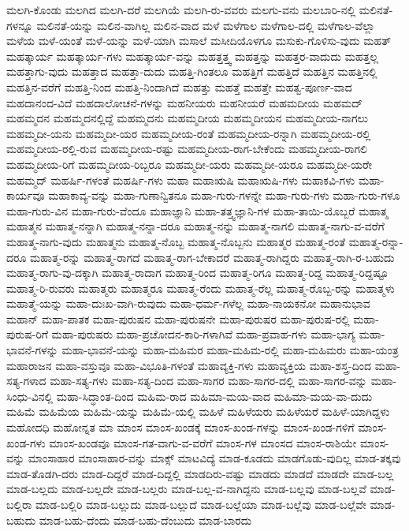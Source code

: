 {ಮಲಗಿ-ಕೊಂಡು
ಮಲಗಿದ
ಮಲಗಿ-ದರೆ
ಮಲಗಿಯೆ
ಮಲಗಿ-ರು-ವವರು
ಮಲಗು-ವನು
ಮಲಬಾರಿ-ನಲ್ಲಿ
ಮಲಿನತೆ-ಗಳನ್ನೂ
ಮಲಿನತೆ-ಯನ್ನು
ಮಲಿನ-ವಾಗಿಲ್ಲ
ಮಲಿನ-ವಾದ
ಮಳೆ
ಮಳೆಗಾಲ
ಮಳೆಗಾಲ-ದಲ್ಲಿ
ಮಳೆಗಾಲ-ವೆಲ್ಲಾ
ಮಳೆಯ
ಮಳೆ-ಯಂತೆ
ಮಳೆ-ಯನ್ನು
ಮಳೆ-ಯಾಗಿ
ಮಸಾಲೆ
ಮಸೀದಿಯೊಳಗೂ
ಮಸುಕು-ಗೊಳಿಸು-ವುದು
ಮಹತ್
ಮಹತ್ಕಾರ್ಯ
ಮಹತ್ಕಾರ್ಯ-ಗಳು
ಮಹತ್ಕಾರ್ಯ-ವನ್ನು
ಮಹತ್ತತ್ತ್ವ
ಮಹತ್ತನ್ನು
ಮಹತ್ತರ-ವಾದುದು
ಮಹತ್ತಲ್ಲ
ಮಹತ್ತಾಗು-ವುದು
ಮಹತ್ತಾದ
ಮಹತ್ತಾ-ದುದು
ಮಹತ್ತಿ-ಗಿಂತಲೂ
ಮಹತ್ತಿಗೆ
ಮಹತ್ತಿದೆ
ಮಹತ್ತಿನ
ಮಹತ್ತಿನಲ್ಲಿ
ಮಹತ್ತಿನ-ವರೆಗೆ
ಮಹತ್ತಿ-ನಿಂದ
ಮಹತ್ತಿ-ನಿಂದಾಗಿದೆ
ಮಹತ್ತು
ಮಹತ್ತೆ
ಮಹತ್ತೇ
ಮಹತ್ವ-ಪೂರ್ಣ-ವಾದ
ಮಹದಾನಂದ-ವಿದೆ
ಮಹದಾಲೋಚನೆ-ಗಳನ್ನು
ಮಹನೀಯರು
ಮಹನೀಯರೆ
ಮಹಮದೀಯ
ಮಹಮದ್
ಮಹಮ್ಮದನ
ಮಹಮ್ಮದನಲ್ಲಿದ್ದೆ
ಮಹಮ್ಮದನು
ಮಹಮ್ಮದೀಯ
ಮಹಮ್ಮದೀಯನ
ಮಹಮ್ಮದೀಯ-ನಾಗಲು
ಮಹಮ್ಮದೀ-ಯನು
ಮಹಮ್ಮದೀ-ಯರ
ಮಹಮ್ಮದೀಯ-ರಂತೆ
ಮಹಮ್ಮದೀಯ-ರನ್ನಾಗಿ
ಮಹಮ್ಮದೀಯ-ರಲ್ಲಿ
ಮಹಮ್ಮದೀಯ-ರಲ್ಲಿ-ರುವ
ಮಹಮ್ಮದೀಯ-ರಷ್ಟು
ಮಹಮ್ಮದೀಯ-ರಾಗ-ಬೇಕೆಂದು
ಮಹಮ್ಮದೀಯ-ರಾಗಲಿ
ಮಹಮ್ಮದೀಯ-ರಿಗೆ
ಮಹಮ್ಮದೀಯ-ರಿಬ್ಬರೂ
ಮಹಮ್ಮದೀ-ಯರು
ಮಹಮ್ಮದೀ-ಯರೂ
ಮಹಮ್ಮದೀ-ಯರೇ
ಮಹಮ್ಮದ್
ಮಹರ್ಷಿ-ಗಳಂತೆ
ಮಹರ್ಷಿ-ಗಳು
ಮಹಾ
ಮಹಾಋಷಿ
ಮಹಾಋಷಿ-ಗಳು
ಮಹಾಕವಿ-ಗಳು
ಮಹಾ-ಕಾರ್ಯವೂ
ಮಹಾಕಾವ್ಯ-ವನ್ನು
ಮಹಾ-ಗುಣಾನ್ವಿತನೂ
ಮಹಾ-ಗುರು-ಗಳನ್ನೇ
ಮಹಾ-ಗುರು-ಗಳು
ಮಹಾ-ಗುರು-ಗಳೂ
ಮಹಾ-ಗುರು-ವಿನ
ಮಹಾ-ಗುರು-ವೆಂದೂ
ಮಹಾಜ್ಞಾನಿ
ಮಹಾ-ತತ್ತ್ವಜ್ಞಾನಿ-ಗಳ
ಮಹಾ-ತಾಯಿ-ಯೊಬ್ಬರೆ
ಮಹಾತ್ಮ
ಮಹಾತ್ಮನ
ಮಹಾತ್ಮ-ನನ್ನಾಗಿ
ಮಹಾತ್ಮ-ನನ್ನಾ-ದರೂ
ಮಹಾತ್ಮ-ನನ್ನು
ಮಹಾತ್ಮ-ನಾಗಲಿ
ಮಹಾತ್ಮ-ನಾಗು-ವ-ವರೆಗೆ
ಮಹಾತ್ಮ-ನಾಗು-ವುದು
ಮಹಾತ್ಮನು
ಮಹಾತ್ಮ-ನೊಬ್ಬ
ಮಹಾತ್ಮ-ನೊಬ್ಬನು
ಮಹಾತ್ಮರ
ಮಹಾತ್ಮ-ರಂತೆ
ಮಹಾತ್ಮ-ರನ್ನಾ-ದರೂ
ಮಹಾತ್ಮ-ರನ್ನು
ಮಹಾತ್ಮ-ರಾಗದೆ
ಮಹಾತ್ಮ-ರಾಗ-ಬೇಕಾದರೆ
ಮಹಾತ್ಮ-ರಾಗಿದ್ದರು
ಮಹಾತ್ಮ-ರಾಗಿ-ರ-ಬಹುದು
ಮಹಾತ್ಮ-ರಾಗು-ವು-ದಕ್ಕಾಗಿ
ಮಹಾತ್ಮ-ರಾದಾಗ
ಮಹಾತ್ಮ-ರಿಂದ
ಮಹಾತ್ಮ-ರಿಗೂ
ಮಹಾತ್ಮ-ರಿದ್ದ
ಮಹಾತ್ಮ-ರಿದ್ದಷ್ಟೂ
ಮಹಾತ್ಮ-ರಿ-ರುವರು
ಮಹಾತ್ಮರು
ಮಹಾತ್ಮರೂ
ಮಹಾತ್ಮ-ರೆಂದು
ಮಹಾತ್ಮ-ರೆಲ್ಲ
ಮಹಾತ್ಮ-ರೊಬ್ಬ-ರನ್ನು
ಮಹಾತ್ಮಳು
ಮಹಾತ್ಮೆ-ಯನ್ನು
ಮಹಾ-ದುಃಖ-ವಾಗಿ-ರುವುದು
ಮಹಾ-ಧರ್ಮ-ಗಳೆಲ್ಲ
ಮಹಾ-ನಾಯಕನೋ
ಮಹಾನುಭಾವ
ಮಹಾನ್
ಮಹಾ-ಪಾತಕ
ಮಹಾ-ಪುರುಷನ
ಮಹಾ-ಪುರುಷನೇ
ಮಹಾ-ಪುರುಷರ
ಮಹಾ-ಪುರುಷ-ರಲ್ಲಿ
ಮಹಾ-ಪುರುಷ-ರಿಗೆ
ಮಹಾ-ಪುರುಷರು
ಮಹಾ-ಪ್ರಚೋದನ-ಕಾರಿ-ಗಳಾಗಿವೆ
ಮಹಾ-ಪ್ರವಾಹ-ಗಳು
ಮಹಾ-ಭಾಗ್ಯ
ಮಹಾ-ಭಾವನೆ-ಗಳನ್ನು
ಮಹಾ-ಭಾವನೆ-ಯನ್ನು
ಮಹಾ-ಮಹಿಮರ
ಮಹಾ-ಮಹಿಮ-ರಲ್ಲಿ
ಮಹಾ-ಮಹಿಮರು
ಮಹಾ-ಯಂತ್ರ
ಮಹಾರಾಜನ
ಮಹಾ-ವಸ್ತುವೂ
ಮಹಾ-ವಿಭೂತಿ-ಗಳಂತೆ
ಮಹಾವ್ಯಕ್ತಿ-ಗಳು
ಮಹಾವ್ಯಕ್ತಿಯ
ಮಹಾ-ಶಸ್ತ್ರ-ದಿಂದ
ಮಹಾ-ಸತ್ಯ-ಗಳಾದ
ಮಹಾ-ಸತ್ಯ-ಗಳು
ಮಹಾ-ಸತ್ಯ-ದಿಂದ
ಮಹಾ-ಸಾಗರ
ಮಹಾ-ಸಾಗರ-ದಲ್ಲಿ
ಮಹಾ-ಸಾಗರ-ವನ್ನು
ಮಹಾ-ಸಿಂಧು-ವಿನಲ್ಲಿ
ಮಹಾ-ಸಿದ್ಧಾಂತ-ದಿಂದ
ಮಹಿಮ-ರಾದ
ಮಹಿಮಾ-ಮಯ-ವಾದ
ಮಹಿಮಾ-ಮಯ-ವಾ-ದುದು
ಮಹಿಮೆ
ಮಹಿಮೆಯ
ಮಹಿಮೆ-ಯನ್ನು
ಮಹಿಮೆ-ಯಲ್ಲಿ
ಮಹಿಳೆ
ಮಹಿಳೆಯರು
ಮಹಿಳೆಯರೆ
ಮಹಿಳೆ-ಯಾಗಿದ್ದಳು
ಮಹೋದಧಿ
ಮಹೋನ್ನತ
ಮಾ
ಮಾಂಸ
ಮಾಂಸ-ಖಂಡಕ್ಕೆ
ಮಾಂಸ-ಖಂಡ-ಗಳನ್ನು
ಮಾಂಸ-ಖಂಡ-ಗಳಿಗೆ
ಮಾಂಸ-ಖಂಡ-ಗಳು
ಮಾಂಸ-ಖಂಡವೂ
ಮಾಂಸ-ಗತ-ವಾಗು-ವ-ವರೆಗೆ
ಮಾಂಸ-ಗಳ
ಮಾಂಸದ
ಮಾಂಸ-ರಾಶಿಯೇ
ಮಾಂಸ-ವನ್ನು
ಮಾಂಸಾಹಾರ
ಮಾಂಸಾಹಾರ-ವನ್ನು
ಮಾಕ್ಸ್
ಮಾಟವಿದ್ಯೆ
ಮಾಡ-ಕೂಡದು
ಮಾಡಗೊಡು-ವುದಿಲ್ಲ
ಮಾಡ-ತಕ್ಕವು
ಮಾಡ-ತೊಡಗಿ-ದರು
ಮಾಡ-ದಿದ್ದರೆ
ಮಾಡ-ದಿದ್ದಲ್ಲಿ
ಮಾಡದಿರು-ವಷ್ಟು
ಮಾಡದು
ಮಾಡದೆ
ಮಾಡದೇ
ಮಾಡ-ಬಲ್ಲ
ಮಾಡ-ಬಲ್ಲದು
ಮಾಡ-ಬಲ್ಲದೇ
ಮಾಡ-ಬಲ್ಲರು
ಮಾಡ-ಬಲ್ಲ-ವ-ನಾಗಿದ್ದನು
ಮಾಡ-ಬಲ್ಲವು
ಮಾಡ-ಬಲ್ಲವೆ
ಮಾಡ-ಬಲ್ಲಿರಾ
ಮಾಡ-ಬಲ್ಲಿರಿ
ಮಾಡ-ಬಲ್ಲುದು
ಮಾಡ-ಬಲ್ಲುದೆ
ಮಾಡ-ಬಲ್ಲೆಯಾ
ಮಾಡ-ಬಲ್ಲೆವು
ಮಾಡ-ಬಲ್ಲೆವೇ
ಮಾಡ-ಬಹುದು
ಮಾಡ-ಬಹು-ದೆಂದು
ಮಾಡ-ಬಹು-ದೆಂಬುದು
ಮಾಡ-ಬಾರದು
}
